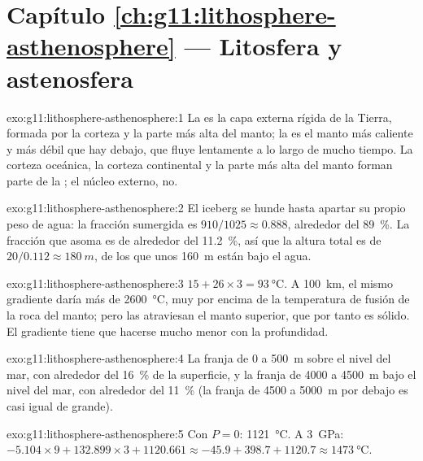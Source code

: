 \section*{Capítulo \ref{ch:g11:lithosphere-asthenosphere} --- Litosfera y astenosfera}

\begin{solution}{exo:g11:lithosphere-asthenosphere:1}
La  es la capa externa rígida de la Tierra, formada por la corteza y
la parte más alta del manto; la  es el manto más caliente y más
débil que hay debajo, que fluye lentamente a lo largo de mucho tiempo. La
corteza oceánica, la corteza continental y la parte más alta del manto forman
parte de la ; el núcleo externo, no.
\end{solution}

\begin{solution}{exo:g11:lithosphere-asthenosphere:2}
El iceberg se hunde hasta apartar su propio peso de agua: la fracción
sumergida es $910/1025 \approx 0.888$, alrededor del \qty{89}{\percent}. La
fracción que asoma es de alrededor del \qty{11.2}{\percent}, así que la altura
total es de $20/0.112 \approx \qty{180}{m}$, de los que unos \qty{160}{m}
están bajo el agua.
\end{solution}

\begin{solution}{exo:g11:lithosphere-asthenosphere:3}
$15 + 26 \times 3 = \qty{93}{\celsius}$. A \qty{100}{km}, el mismo gradiente
daría más de \qty{2600}{\celsius}, muy por encima de la temperatura de fusión
de la roca del manto; pero las  atraviesan el manto superior, que por
tanto es sólido. El gradiente tiene que hacerse mucho menor con la
profundidad.
\end{solution}

\begin{solution}{exo:g11:lithosphere-asthenosphere:4}
La franja de 0 a \qty{500}{m} sobre el nivel del mar, con alrededor del
\qty{16}{\percent} de la superficie, y la franja de 4000 a \qty{4500}{m} bajo
el nivel del mar, con alrededor del \qty{11}{\percent} (la franja de 4500 a
\qty{5000}{m} por debajo es casi igual de grande).
\end{solution}

\begin{solution}{exo:g11:lithosphere-asthenosphere:5}
Con $P = 0$: \qty{1121}{\celsius}. A \qty{3}{GPa}: $-5.104 \times 9 +
132.899 \times 3 + 1120.661 \approx -45.9 + 398.7 + 1120.7 \approx
\qty{1473}{\celsius}$.
\end{solution}

